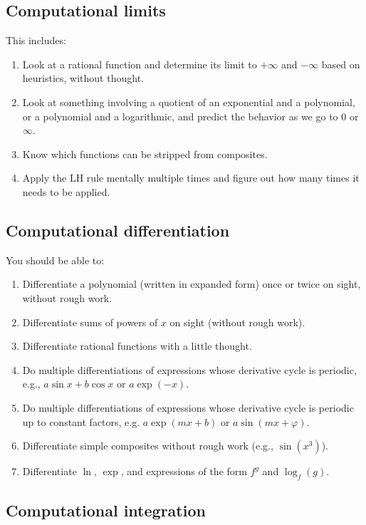 \documentclass[10pt]{amsart}
\begin{document}
\subsection{Computational limits}

This includes:

\begin{enumerate}
\item Look at a rational function and determine its limit to $+\infty$
  and $-\infty$ based on heuristics, without thought.
\item Look at something involving a quotient of an exponential and a
  polynomial, or a polynomial and a logarithmic, and predict the
  behavior as we go to $0$ or $\infty$.
\item Know which functions can be stripped from composites.
\item Apply the LH rule mentally multiple times and figure out how
  many times it needs to be applied.
\end{enumerate}

\subsection{Computational differentiation}

You should be able to:

\begin{enumerate}
\item Differentiate a polynomial (written in expanded form) once or
  twice on sight, without rough work.
\item Differentiate sums of powers of $x$ on sight (without rough
  work).
\item Differentiate rational functions with a little thought.
\item Do multiple differentiations of expressions whose derivative
  cycle is periodic, e.g., $a \sin x + b \cos x$ or $a \exp(-x)$.
\item Do multiple differentiations of expressions whose derivative
  cycle is periodic up to constant factors, e.g. $a \exp(mx + b)$ or $a
  \sin(mx + \varphi)$.
\item Differentiate simple composites without rough work (e.g.,
  $\sin(x^3)$).
\item Differentiate $\ln$, $\exp$, and expressions of the form $f^g$
  and $\log_f(g)$.
\end{enumerate}

\subsection{Computational integration}
\end{document}
